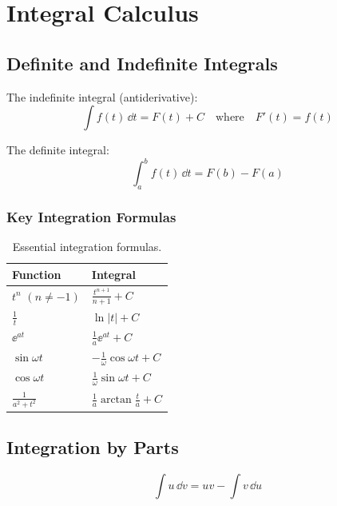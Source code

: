 \section{Integral Calculus}

\subsection{Definite and Indefinite Integrals}

The indefinite integral (antiderivative):
\begin{equation}
\int f(t) \, \dd t = F(t) + C \quad \text{where} \quad F'(t) = f(t)
\end{equation}

The definite integral:
\begin{equation}
\int_a^b f(t) \, \dd t = F(b) - F(a)
\end{equation}

\subsubsection{Key Integration Formulas}

\begin{table}[htbp]
\centering
\begin{tabular}{ll}
\toprule
\textbf{Function} & \textbf{Integral} \\
\midrule
$t^n$ $(n \neq -1)$ & $\frac{t^{n+1}}{n+1} + C$ \\
$\frac{1}{t}$ & $\ln|t| + C$ \\
$\ee^{at}$ & $\frac{1}{a}\ee^{at} + C$ \\
$\sin\omega t$ & $-\frac{1}{\omega}\cos\omega t + C$ \\
$\cos\omega t$ & $\frac{1}{\omega}\sin\omega t + C$ \\
$\frac{1}{a^2 + t^2}$ & $\frac{1}{a}\arctan\frac{t}{a} + C$ \\
\bottomrule
\end{tabular}
\caption{Essential integration formulas.}
\label{tab:int_rules}
\end{table}

\subsection{Integration by Parts}

\begin{equation}
\int u \, \dd v = uv - \int v \, \dd u
\end{equation}

